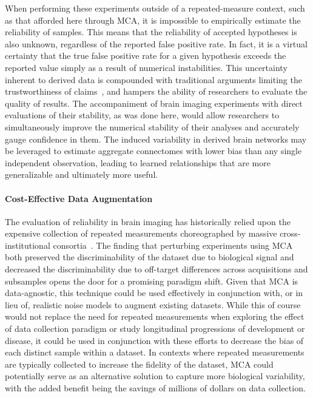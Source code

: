 \documentclass[10pt,letterpaper]{article}
\begin{document}
When performing these experiments outside of a repeated-measure context, such as that
afforded here through MCA, it is impossible to empirically estimate the reliability of 
samples. This means that the reliability of accepted hypotheses is also unknown,
regardless of the reported false positive rate. In fact, it is a virtual certainty
that the true false positive rate for a given hypothesis exceeds the reported value
simply as a result of numerical instabilities. This uncertainty inherent to derived
data is compounded with traditional arguments limiting the trustworthiness of
claims~\cite{ioannidis2005most}, and hampers the ability of researchers to evaluate
the quality of results. The accompaniment of brain imaging experiments with direct
evaluations of their stability, as was done here, would allow researchers to
simultaneously improve the numerical stability of their analyses and accurately gauge
confidence in them. The induced variability in derived brain networks may be leveraged 
to estimate aggregate connectomes with lower bias than any single independent
observation, leading to learned relationships that are more generalizable and
ultimately more useful.

\paragraph{Cost-Effective Data Augmentation}
The evaluation of reliability in brain imaging has historically relied upon the
expensive collection of repeated measurements choreographed by massive
cross-institutional consortia~\cite{van2013wu,zuo2014open}. The finding that perturbing
experiments using MCA both preserved the discriminability of the dataset due to
biological signal and decreased the discriminability due to off-target differences
across acquisitions and subsamples opens the door for a promising paradigm shift.
Given that MCA is data-agnostic, this technique could be used effectively in
conjunction with, or in lieu of, realistic noise models to augment existing datasets.
While this of course would not replace the need for repeated measurements when
exploring the effect of data collection paradigm or study longitudinal progressions of 
development or disease, it could be used in conjunction with these efforts to decrease 
the bias of each distinct sample within a dataset. In contexts where repeated
measurements are typically collected to increase the fidelity of the dataset, MCA
could potentially serve as an alternative solution to capture more biological
variability, with the added benefit being the savings of millions of dollars on data
collection. 
\end{document}
